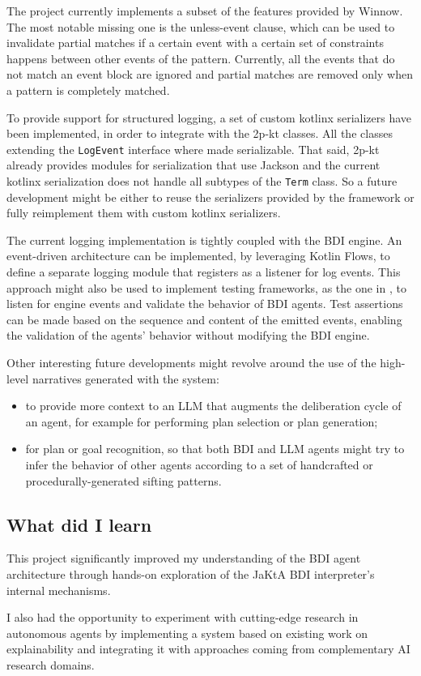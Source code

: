 \documentclass{scrartcl}
\begin{document}
The project currently implements a subset of the features provided by Winnow.
%
The most notable missing one is the unless-event clause, which can be used to invalidate partial matches if a certain event with a certain set of constraints happens between other events of the pattern. 
%
Currently, all the events that do not match an event block are ignored and partial matches are removed only when a pattern is completely matched.

To provide support for structured logging, a set of custom kotlinx serializers have been implemented, in order to integrate with the 2p-kt classes. 
%
All the classes extending the \verb|LogEvent| interface where made serializable.
%
That said, 2p-kt already provides modules for serialization that use Jackson and the current kotlinx serialization does not handle all subtypes of the \verb|Term| class.
%
So a future development might be either to reuse the serializers provided by the framework or fully reimplement them with custom kotlinx serializers.

The current logging implementation is tightly coupled with the BDI engine. 
%
An event-driven architecture can be implemented, by leveraging Kotlin Flows, to define a separate logging module that registers as a listener for log events.
%
This approach might also be used to implement testing frameworks, as the one in \cite{DBLP:conf/ecai/PiresS24}, to listen for engine events and validate the behavior of BDI agents.
%
Test assertions can be made based on the sequence and content of the emitted events, enabling the validation of the agents' behavior without modifying the BDI engine.

Other interesting future developments might revolve around the use of the high-level narratives generated with the system:

\begin{itemize}
\item to provide more context to an LLM that augments the deliberation cycle of an agent, for example for performing plan selection or plan generation;
\item for plan or goal recognition, so that both BDI and LLM agents might try to infer the behavior of other agents according to a set of handcrafted or procedurally-generated sifting patterns.
\end{itemize}

\subsection{What did I learn}

This project significantly improved my understanding of the BDI agent architecture through hands-on exploration of the JaKtA BDI interpreter's internal mechanisms. 

I also had the opportunity to experiment with cutting-edge research in autonomous agents by implementing a system based on existing work on explainability and integrating it with approaches coming from complementary AI research domains.

\nocite{*}


\end{document}
